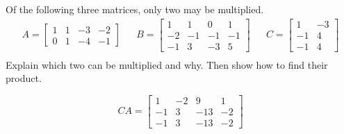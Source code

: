 
\begin{exerciseStatement}


Of the following three matrices, only two may be multiplied. 
\begin{align*} A= \left[\begin{array}{cccc}
1 & 1 & -3 & -2 \\
0 & 1 & -4 & -1
\end{array}\right]  & & B= \left[\begin{array}{cccc}
1 & 1 & 0 & 1 \\
-2 & -1 & -1 & -1 \\
-1 & 3 & -3 & 5
\end{array}\right]  & & C= \left[\begin{array}{cc}
1 & -3 \\
-1 & 4 \\
-1 & 4
\end{array}\right]  \\ \end{align*}
             Explain which two can be multiplied and why. Then show how to find their product.


\end{exerciseStatement}
    
\begin{exerciseAnswer} 
\[CA= \left[\begin{array}{cccc}
1 & -2 & 9 & 1 \\
-1 & 3 & -13 & -2 \\
-1 & 3 & -13 & -2
\end{array}\right] \]
\end{exerciseAnswer}
    
